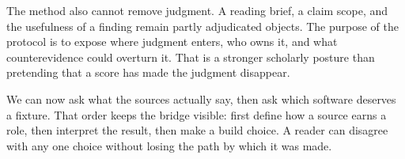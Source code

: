 The method also cannot remove judgment. A reading brief, a claim scope, and
the usefulness of a finding remain partly adjudicated objects. The purpose of
the protocol is to expose where judgment enters, who owns it, and what
counterevidence could overturn it. That is a stronger scholarly posture than
pretending that a score has made the judgment disappear.

We can now ask what the sources actually say, then ask which software deserves
a fixture. That order keeps the bridge visible: first define how a source earns
a role, then interpret the result, then make a build choice. A reader can
disagree with any one choice without losing the path by which it was made.

